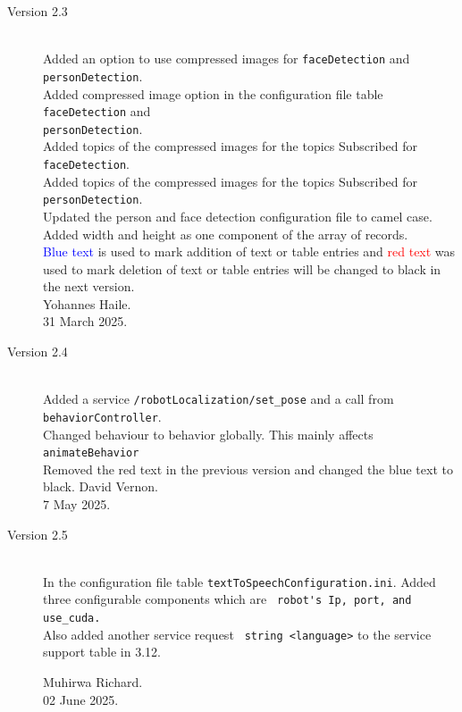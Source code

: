 \documentclass{CSSRforAfrica}
\begin{document}
{{\begin{description}
\item [Version 2.3]~\\
Added an option to use compressed images for \texttt{faceDetection} and \texttt{personDetection}. \\
Added compressed image option in the configuration file table \texttt{faceDetection} and \\
\texttt{personDetection}.\\
Added topics of the compressed images for the topics Subscribed  for \texttt{faceDetection}.\\
Added topics of the compressed images for the topics Subscribed for \texttt{personDetection}.\\
Updated the person and face detection configuration file to camel case.\\
Added width and height as one component of the array of records.\\
\textcolor{blue}{Blue text} is used to mark addition of text or table entries and \textcolor{red}{red text} was used to mark deletion of
text or table entries will be changed to black in the next version.\\
Yohannes Haile.\\
31 March 2025.


\item [Version 2.4]~\\
Added a service  {\small \verb+/robotLocalization/set_pose+} and a call from  {\small \verb+behaviorController+}.\\
Changed behaviour to behavior globally. This mainly affects  {\small \verb+animateBehavior+}\\
Removed the red text in the previous version and changed the blue text to black.
David Vernon.\\
7 May 2025.

\item [Version 2.5]~\\
In the configuration file table {\small \verb+textToSpeechConfiguration.ini+}. Added three configurable components which are {\small \verb+ robot's Ip, port, and use_cuda.+} \\
Also added another service request {\small \verb+ string <language>+} to the service support table in 3.12.

Muhirwa Richard.\\
02 June 2025.


\end{description}}}
\end{document}
